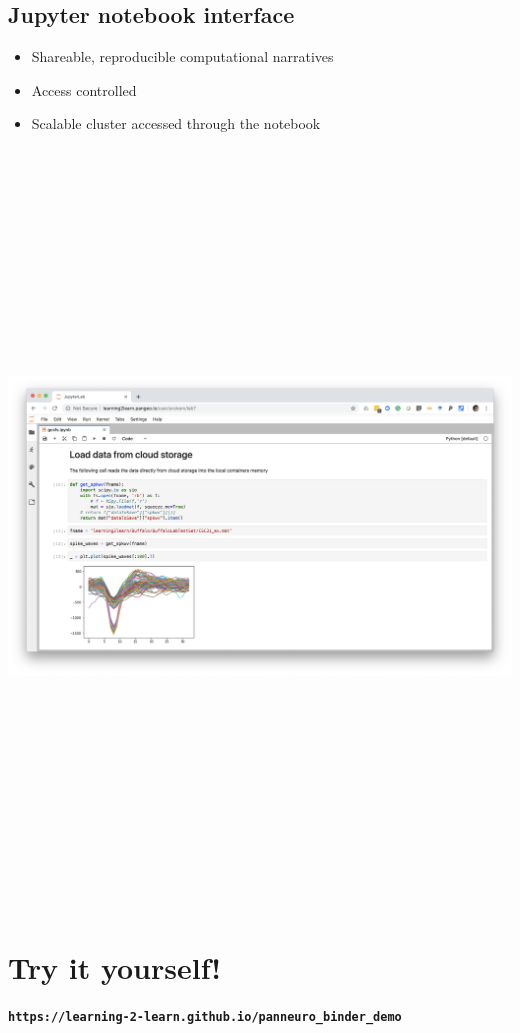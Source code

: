\documentclass[a0, landscape]{a0poster}
\begin{document}
\begin{multicols}{3}
\vfill
\columnbreak

\subsection*{Jupyter notebook interface}

\begin{itemize}
\item Shareable, reproducible computational narratives
\item Access controlled
\item Scalable cluster accessed through the notebook
\end{itemize}
\includegraphics[height=20cm]{notebook_example}


\section*{Try it yourself!}
{\bf \large \texttt{https://learning-2-learn.github.io/panneuro\_binder\_demo}}


\end{multicols}
\end{document}
